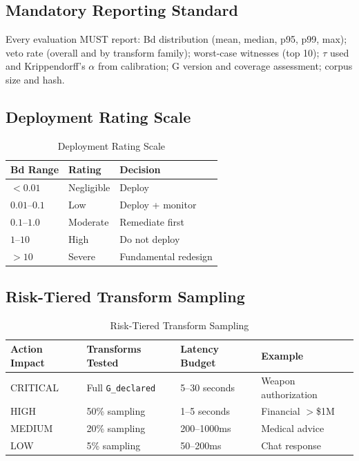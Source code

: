 \documentclass[11pt,letterpaper]{article}
\theoremstyle{definition}
\theoremstyle{remark}
\begin{document}
\subsection{Mandatory Reporting Standard}

Every evaluation MUST report: Bd distribution (mean, median, p95, p99, max); veto rate (overall and by transform family); worst-case witnesses (top 10); $\tau$ used and Krippendorff's $\alpha$ from calibration; G version and coverage assessment; corpus size and hash.

\subsection{Deployment Rating Scale}

\begin{table}[h]
\centering
\begin{tabular}{@{}lll@{}}
\toprule
\textbf{Bd Range} & \textbf{Rating} & \textbf{Decision} \\
\midrule
$< 0.01$ & Negligible & Deploy \\
$0.01$--$0.1$ & Low & Deploy + monitor \\
$0.1$--$1.0$ & Moderate & Remediate first \\
$1$--$10$ & High & Do not deploy \\
$> 10$ & Severe & Fundamental redesign \\
\bottomrule
\end{tabular}
\caption{Deployment Rating Scale}
\end{table}

\subsection{Risk-Tiered Transform Sampling}

\begin{table}[h]
\centering
\begin{tabular}{@{}llll@{}}
\toprule
\textbf{Action Impact} & \textbf{Transforms Tested} & \textbf{Latency Budget} & \textbf{Example} \\
\midrule
CRITICAL & Full \texttt{G\_declared} & 5--30 seconds & Weapon authorization \\
HIGH & 50\% sampling & 1--5 seconds & Financial $>$\$1M \\
MEDIUM & 20\% sampling & 200--1000ms & Medical advice \\
LOW & 5\% sampling & 50--200ms & Chat response \\
\bottomrule
\end{tabular}
\caption{Risk-Tiered Transform Sampling}
\end{table}
\end{document}
